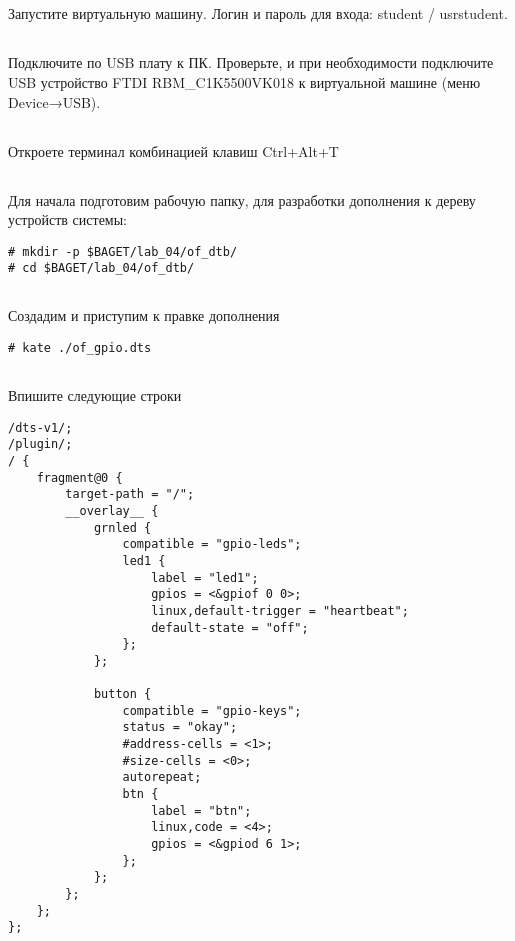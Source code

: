 \subsection{}Запустите виртуальную машину. Логин и пароль для входа: student / usrstudent.

\subsection{}Подключите по USB плату к ПК. Проверьте, и при необходимости подключите USB устройство FTDI RBM\_C1K5500VK018 к виртуальной машине (меню Device→USB).

\subsection{}Откроете терминал комбинацией клавиш Ctrl+Alt+T

\subsection{}Для начала подготовим рабочую папку, для разработки дополнения к дереву устройств системы: 
\begin{lstlisting}[style=bash]
# mkdir -p $BAGET/lab_04/of_dtb/
# cd $BAGET/lab_04/of_dtb/
\end{lstlisting}

\subsection{}Создадим и приступим к правке дополнения 
\begin{lstlisting}[style=bash]
# kate ./of_gpio.dts
\end{lstlisting}

\subsection{}Впишите следующие строки
\begin{lstlisting}[style=stdout]
/dts-v1/;
/plugin/;
/ {
	fragment@0 {
		target-path = "/";
		__overlay__ {
			grnled {
				compatible = "gpio-leds";
				led1 {
					label = "led1";
					gpios = <&gpiof 0 0>;
					linux,default-trigger = "heartbeat";
					default-state = "off";
				};
			};
			
			button {
				compatible = "gpio-keys";
				status = "okay";
				#address-cells = <1>;
				#size-cells = <0>;
				autorepeat;
				btn {
					label = "btn";
					linux,code = <4>;
					gpios = <&gpiod 6 1>;
				};
			};
		};
	};
};
\end{lstlisting}

